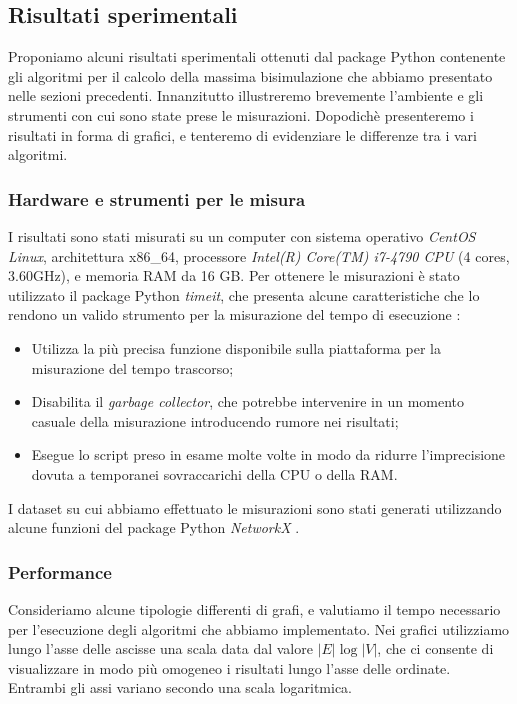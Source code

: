 \subsection{Risultati sperimentali}
\label{sec:results}
Proponiamo alcuni risultati sperimentali ottenuti dal package Python contenente gli algoritmi per il calcolo della massima bisimulazione che abbiamo presentato nelle sezioni precedenti. Innanzitutto illustreremo brevemente l'ambiente e gli strumenti con cui sono state prese le misurazioni. Dopodichè presenteremo i risultati in forma di grafici, e tenteremo di evidenziare le differenze tra i vari algoritmi.

\subsubsection{Hardware e strumenti per le misura}
I risultati sono stati misurati su un computer con sistema operativo \emph{CentOS Linux}, architettura x86\_64, processore \emph{Intel(R) Core(TM) i7-4790 CPU} (4 cores, 3.60GHz), e memoria RAM da 16 GB. Per ottenere le misurazioni è stato utilizzato il package Python \emph{timeit}, che presenta alcune caratteristiche che lo rendono un valido strumento per la misurazione del tempo di esecuzione \cite{pythondocs}:
\begin{itemize}
    \item Utilizza la più precisa funzione disponibile sulla piattaforma per la misurazione del tempo trascorso;
    \item Disabilita il \emph{garbage collector}, che potrebbe intervenire in un momento casuale della misurazione introducendo rumore nei risultati;
    \item Esegue lo script preso in esame molte volte in modo da ridurre l'imprecisione dovuta a temporanei sovraccarichi della CPU o della RAM.
\end{itemize}

I dataset su cui abbiamo effettuato le misurazioni sono stati generati utilizzando alcune funzioni del package Python \emph{NetworkX} \cite{networkx}.

\subsubsection{Performance}
Consideriamo alcune tipologie differenti di grafi, e valutiamo il tempo necessario per l'esecuzione degli algoritmi che abbiamo implementato. Nei grafici utilizziamo lungo l'asse delle ascisse una scala data dal valore $|E| \log |V|$, che ci consente di visualizzare in modo più omogeneo i risultati lungo l'asse delle ordinate. Entrambi gli assi variano secondo una scala logaritmica.

